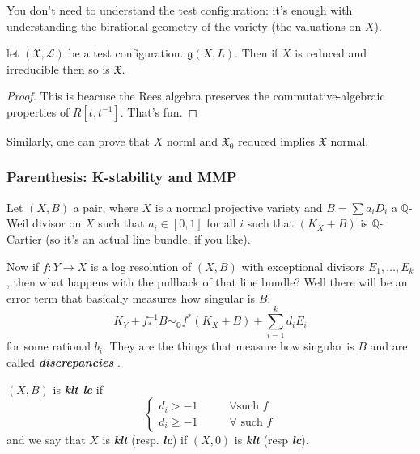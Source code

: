 \begin{upshot}\leavevmode
You don't need to understand the test configuration: it's enough with understanding the birational geometry of the variety (the valuations on \(X\)).
\end{upshot}

\begin{coro}\leavevmode
let \((\mathfrak{X},\mathcal{L})\) be a test configuration. \(\mathfrak{g}(X,L)\). Then  if \(X\) is reduced and irreducible then so is \(\mathfrak{X}\).
\end{coro}

\begin{proof}\leavevmode
	This is beacuse the Rees algebra preserves the commutative-algebraic properties of \(R[t,t^{-1}]\). That's fun.
\end{proof}

\begin{remark}\leavevmode
Similarly, one can prove that \(X\) norml and \(\mathfrak{X}_0\) reduced implies \(\mathfrak{X}\) normal.
\end{remark}

\subsubsection{Parenthesis: K-stability and MMP}

Let \((X,B)\) a pair, where \(X\) is a normal projective variety and \(B=\sum a_i D_i\) a \(\mathbb{Q}\)-Weil divisor on \(X\) such that \( a_i \in [0,1]\) for all \(i\) such that \((K_X+B)\) is \(\mathbb{Q}\)-Cartier (so it's an actual line bundle, if you like).

Now if \( f:Y \to X\) is a log resolution of \((X,B)\) with exceptional divisors \(E_1,\ldots,E_k\), then what happens with the pullback of that line bundle? Well there will be an error term that basically measures how singular is \(B\):
\[K_Y+f^{-1}_*B \sim_\mathbb{Q} f^* (K_X+B)+\sum_{i=1}^k d_i E_i\]
for some rational \(b_i\). They are the things that measure how singular is \(B\) and are called \textit{\textbf{discrepancies} }.

\begin{defn}\leavevmode
\((X,B)\) is \textit{\textbf{klt lc}} if
\[\begin{cases}
	d_i>-1\qquad &\forall \text{such \(f\)}  \\
	d_i \geq -1\qquad &\forall \text{ such \(f\)} 
\end{cases}\]
and we say that \(X\) is \textit{\textbf{klt}} (resp. \textit{\textbf{lc}}) if \((X,0)\) is \textit{\textbf{klt}} (resp \textit{\textbf{lc}}).
\end{defn}

